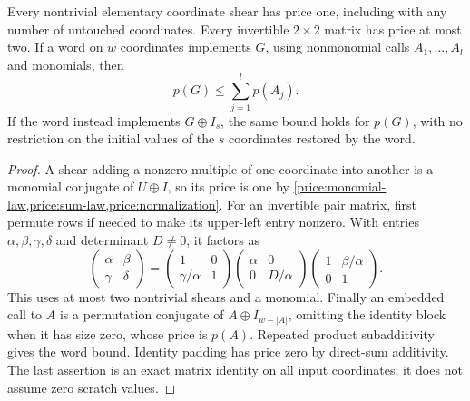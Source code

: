 \begin{corollary}
\label{price:word-bounds}
Every nontrivial elementary coordinate shear has price one, including
with any number of untouched coordinates.  Every invertible
\(2\times2\) matrix has price at most two.  If a word on \(w\)
coordinates implements \(G\), using nonmonomial calls
\(A_1,\ldots,A_l\) and monomials, then
\[
 p(G)\leq\sum_{j=1}^l p(A_j).
\]
If the word instead implements \(G\oplus I_s\), the same bound holds
for \(p(G)\), with no restriction on the initial values of the
\(s\) coordinates restored by the word.
\end{corollary}

\begin{proof}
A shear adding a nonzero multiple of one coordinate into another is a
monomial conjugate of \(U\oplus I\), so its price is one by
\cref{price:monomial-law,price:sum-law,price:normalization}.
For an invertible pair matrix, first permute rows if needed to make its
upper-left entry nonzero.  With entries \(\alpha,\beta,\gamma,\delta\)
and determinant \(D\ne0\), it factors as
\[
 \begin{pmatrix}\alpha&\beta\\\gamma&\delta\end{pmatrix}
 =\begin{pmatrix}1&0\\\gamma/\alpha&1\end{pmatrix}
  \begin{pmatrix}\alpha&0\\0&D/\alpha\end{pmatrix}
  \begin{pmatrix}1&\beta/\alpha\\0&1\end{pmatrix}.
\]
This uses at most two nontrivial shears and a monomial.  Finally an
embedded call to \(A\) is a permutation conjugate of
\(A\oplus I_{w-|A|}\), omitting the identity block when it has size
zero, whose price is \(p(A)\).  Repeated product
subadditivity gives the word bound.  Identity padding has price zero
by direct-sum additivity.  The last assertion is an exact matrix
identity on all input coordinates; it does not assume zero scratch
values.
\end{proof}
